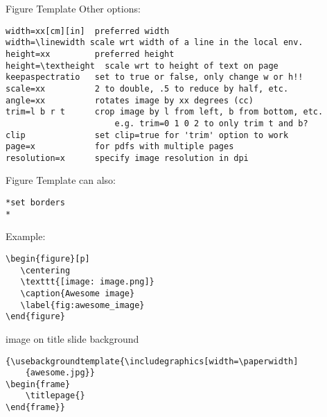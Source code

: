 \documentclass[9pt]{beamer}
\begin{document}
\begin{frame}[fragile=singleslide]{Figure Template}
Other options:
    \begin{verbatim}
width=xx[cm][in]  preferred width
width=\linewidth scale wrt width of a line in the local env.
height=xx         preferred height
height=\textheight  scale wrt to height of text on page
keepaspectratio   set to true or false, only change w or h!!
scale=xx          2 to double, .5 to reduce by half, etc.
angle=xx          rotates image by xx degrees (cc)
trim=l b r t      crop image by l from left, b from bottom, etc.
                      e.g. trim=0 1 0 2 to only trim t and b?
clip              set clip=true for 'trim' option to work
page=x            for pdfs with multiple pages
resolution=x      specify image resolution in dpi
    \end{verbatim}
\end{frame}%
\begin{frame}[fragile=singleslide]{Figure Template}
    can also:
    \begin{verbatim}
*set borders
*
    \end{verbatim}
    Example:
    \begin{verbatim}
\begin{figure}[p]
   \centering
   \texttt{[image: image.png]}
   \caption{Awesome image}
   \label{fig:awesome_image}
\end{figure}
    \end{verbatim}
\end{frame}%
\begin{frame}[fragile=singleslide]{image on title slide background}
    \begin{verbatim}
{\usebackgroundtemplate{\includegraphics[width=\paperwidth]
    {awesome.jpg}}
\begin{frame}
    \titlepage{}
\end{frame}}
    \end{verbatim}
\end{frame}%
\end{document}
